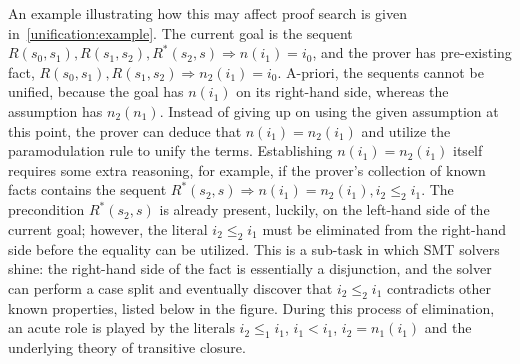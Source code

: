 An example illustrating how this may affect proof search is given in~\autoref{unification:example}.
The current goal is the sequent
$R(s_0,s_1), R(s_1,s_2),R^*(s_2,s) \Rightarrow
n(i_1) = i_0$,
and the prover has pre-existing fact,
$R(s_0,s_1), R(s_1,s_2) \Rightarrow n_2(i_1)=i_0$.
A-priori, the sequents cannot be unified, because the goal has $n(i_1)$ on its right-hand side, whereas the assumption has $n_2(n_1)$.
Instead of giving up on using the given assumption at this point, the prover can deduce that $n(i_1)=n_2(i_1)$ and utilize the paramodulation rule to unify the terms.
Establishing $n(i_1)=n_2(i_1)$ itself requires some extra reasoning, for example, if the prover's collection of known facts contains the sequent
$R^*(s_2,s)\Rightarrow n(i_1)=n_2(i_1), i_2\leq_2 i_1$.
The precondition $R^*(s_2,s)$ is already present, luckily, on the left-hand side of the current goal;
however, the literal $i_2\leq_2 i_1$ must be eliminated from the right-hand side before the equality can be utilized.
This is a sub-task in which SMT solvers shine:
the right-hand side of the fact is essentially a disjunction, and the solver can perform a case split and eventually discover that $i_2\leq_2 i_1$ contradicts other known properties, listed below in the figure.
During this process of elimination, an acute role is played by the literals $i_2\leq_1 i_1$, $i_1<i_1$, $i_2=n_1(i_1)$ and the underlying theory of transitive closure.